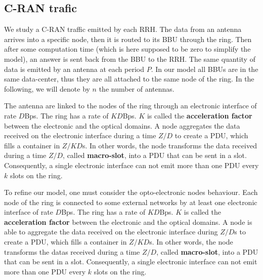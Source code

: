 \documentclass[]{algotel}
\begin{document}
   \subsection{C-RAN trafic}
   
   We study a C-RAN traffic emitted by each RRH. The data from an antenna arrives into a specific node, then it is routed to 
   its BBU through the ring. Then after some computation time (which is here supposed to be zero to simplify the model),
   an answer is sent back from the BBU to the RRH. The same quantity of data is emitted by an antenna at each period $P$. 
   In our model all BBUs are in the same data-center, thus they are all attached to the same node of the ring. In the following, we will denote by $n$ the number of antennas.
   
   The antenna are linked to the nodes of the ring through an electronic interface of rate $D$Bps.
   The ring has a rate of $KD$Bps. $K$ is called the {\bf acceleration factor} between the electronic and the optical domains. A node aggregates the data received on the electronic interface during a time $Z/D$ to create a PDU, which fills a container in $Z/KD$s. In other words, the node transforms the data received during a time $Z/D$, called {\bf macro-slot}, into a PDU that can be sent in a slot. Consequently, a single electronic interface can not emit more than one PDU every $k$ slots on the ring.
    
    
   To refine our model, one must consider the opto-electronic nodes behaviour.
   Each node of the ring is connected to some external networks by at least one electronic interface of rate $D$Bps. The ring has a rate of $KD$Bps. $K$ is called the {\bf acceleration factor} between the electronic and the optical domains. A node is able to aggregate the data received on the electronic interface during $Z/D$s to create a PDU, which fills a container in $Z/KD$s. In other words, the node transforms the datas received during a time $Z/D$, called {\bf macro-slot}, into a PDU that can be sent in a slot. Consequently, a single electronic interface can not emit more than one PDU every $k$ slots on the ring.
    
\end{document}

